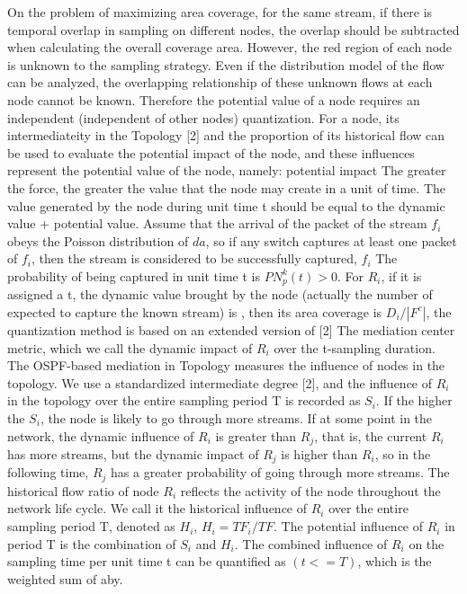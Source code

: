 \documentclass[conference,compsoc]{IEEEtran}
\begin{document}
On the problem of maximizing area coverage, for the same stream, if there is temporal overlap in sampling on different nodes, the overlap should be subtracted when calculating the overall coverage area. However, the red region of each node is unknown to the sampling strategy. Even if the distribution model of the flow can be analyzed, the overlapping relationship of these unknown flows at each node cannot be known. Therefore the potential value of a node requires an independent (independent of other nodes) quantization. For a node, its intermediateity in the Topology [2] and the proportion of its historical flow can be used to evaluate the potential impact of the node, and these influences represent the potential value of the node, namely: potential impact The greater the force, the greater the value that the node may create in a unit of time. The value generated by the node during unit time t should be equal to the dynamic value $+$ potential value. Assume that the arrival of the packet of the stream $f_i$ obeys the Poisson distribution of $da$, so if any switch captures at least one packet of $f_i$, then the stream is considered to be successfully captured, $f_i$ The probability of being captured in unit time t is $P{N_p^k (t)>0}$. For $R_i$, if it is assigned a t, the dynamic value brought by the node (actually the number of expected to capture the known stream) is $  $, then its area coverage is $D_i/|F^c|$, the quantization method is based on an extended version of [2] The mediation center metric, which we call the dynamic impact of $R_i$ over the t-sampling duration. The OSPF-based mediation in Topology measures the influence of nodes in the topology. We use a standardized intermediate degree [2], and the influence of $R_i$ in the topology over the entire sampling period T is recorded as $S_i$. If the higher the $S_i$, the node is likely to go through more streams. If at some point in the network, the dynamic influence of $R_i$ is greater than $R_j$, that is, the current $R_i$ has more streams, but the dynamic impact of $R_j$ is higher than $R_i$, so in the following time, $R_j$ has a greater probability of going through more streams. The historical flow ratio of node $R_i$ reflects the activity of the node throughout the network life cycle. We call it the historical influence of $R_i$ over the entire sampling period T, denoted as $H_i $, $H_i = TF_i /TF$. The potential influence of $R_i$ in period T is the combination of $S_i$ and $H_i$. The combined influence of $R_i$ on the sampling time per unit time t can be quantified as $(t<=T)$, which is the weighted sum of aby.
\end{document}
